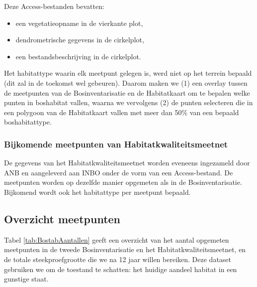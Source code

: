 \documentclass[twoside]{extreport}
\begin{document}
Deze Access-bestanden bevatten:

\begin{itemize}
\tightlist
\item
  een vegetatieopname in de vierkante plot,
\item
  dendrometrische gegevens in de cirkelplot,
\item
  een bestandsbeschrijving in de cirkelplot.
\end{itemize}

Het habitattype waarin elk meetpunt gelegen is, werd niet op het terrein
bepaald (dit zal in de toekomst wel gebeuren). Daarom maken we (1) een
overlay tussen de meetpunten van de Bosinventarisatie en de Habitatkaart
\citep{DeSaeger2018} om te bepalen welke punten in boshabitat vallen,
waarna we vervolgens (2) de punten selecteren die in een polygoon van de
Habitatkaart vallen met meer dan 50\% van een bepaald boshabitattype.

\subsubsection{Bijkomende meetpunten van
Habitatkwaliteitsmeetnet}\label{bijkomende-meetpunten-van-habitatkwaliteitsmeetnet}

De gegevens van het Habitatkwaliteitsmeetnet \citep{Westra2014} worden
eveneens ingezameld door ANB en aangeleverd aan INBO onder de vorm van
een Access-bestand. De meetpunten worden op dezelfde manier opgemeten
als in de Bosinventarisatie. Bijkomend wordt ook het habitattype per
meetpunt bepaald.

\subsection{Overzicht meetpunten}\label{overzicht-meetpunten-3}

Tabel \ref{tab:BostabAantallen} geeft een overzicht van het aantal
opgemeten meetpunten in de tweede Bosinventarisatie en het
Habitatkwaliteitsmeetnet, en de totale steekproefgrootte die we na 12
jaar willen bereiken. Deze dataset gebruiken we om de toestand te
schatten: het huidige aandeel habitat in een gunstige staat.
\end{document}
